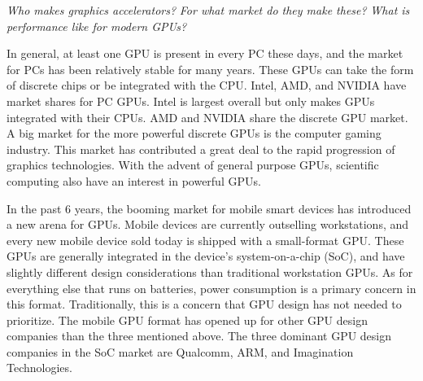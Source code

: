 \documentclass[../main/report.tex]{subfiles}
\begin{document}
\textit{Who makes graphics accelerators?}
\textit{For what market do they make these?}
\textit{What is performance like for modern GPUs?}



In general, at least one GPU is present in every PC these days, and the market for PCs has been relatively stable for many years.
These GPUs can take the form of discrete chips or be integrated with the CPU.
Intel, AMD, and NVIDIA have market shares for PC GPUs.
Intel is largest overall but only makes GPUs integrated with their CPUs.
AMD and NVIDIA share the discrete GPU market.
A big market for the more powerful discrete GPUs is the computer gaming industry.
This market has contributed a great deal to the rapid progression of graphics technologies.
With the advent of general purpose GPUs, scientific computing also have an interest in powerful GPUs.

In the past 6 years, the booming market for mobile smart devices has introduced a new arena for GPUs.
Mobile devices are currently outselling workstations, and every new mobile device sold today is shipped with a small-format GPU.
These GPUs are generally integrated in the device's system-on-a-chip (SoC), and have slightly different design considerations than traditional workstation GPUs.
As for everything else that runs on batteries, power consumption is a primary concern in this format.
Traditionally, this is a concern that GPU design has not needed to prioritize.
The mobile GPU format has opened up for other GPU design companies than the three mentioned above.
The three dominant GPU design companies in the SoC market are Qualcomm, ARM, and Imagination Technologies.

\end{document}
